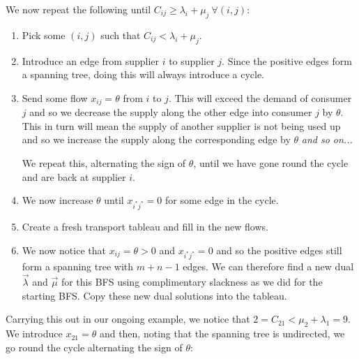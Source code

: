 \documentclass[../main.tex]{subfiles}
\begin{document}
We now repeat the following until $C_{i j} \geq \lambda_i + \mu_j\ \forall (i, j)$:
\begin{enumerate}
  \item Pick some $(i, j)$ such that $C_{i j} < \lambda_i + \mu_j$.
  \item Introduce an edge from supplier $i$ to supplier $j$.
    Since the positive edges form a spanning tree, doing this will always introduce a cycle.
  \item Send some flow $x_{i j} = \theta$ from $i$ to $j$.
    This will exceed the demand of consumer $j$ and so we decrease the supply along the other edge into consumer $j$ by $\theta$.
    This in turn will mean the supply of another supplier is not being used up and so we increase the supply along the corresponding edge by $\theta$ \textit{and so on...}

    We repeat this, alternating the sign of $\theta$, until we have gone round the cycle and are back at supplier $i$.
  \item We now increase $\theta$ until $x_{i^{*} j^{*}} = 0$ for some edge in the cycle.
  \item Create a fresh transport tableau and fill in the new flows.
  \item We now notice that $x_{i j} = \theta > 0$ and $x_{i^{*} j^{*}} = 0$ and so the positive edges still form a spanning tree with $m + n - 1$ edges.
    We can therefore find a new dual $\vec{\lambda}$ and $\vec{\mu}$ for this BFS using complimentary slackness as we did for the starting BFS.
    Copy these new dual solutions into the tableau.
\end{enumerate}
Carrying this out in our ongoing example, we notice that $2 = C_{2 1} < \mu_2 + \lambda_1 = 9$.
We introduce $x_{2 1} = \theta$ and then, noting that the spanning tree is undirected, we go round the cycle alternating the sign of $\theta$:
\end{document}
